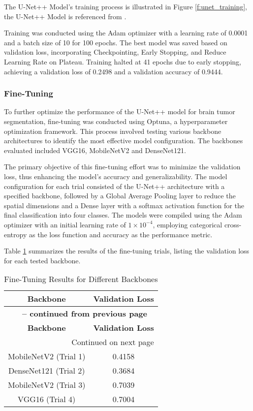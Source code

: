 The U-Net++ Model's training process is illustrated in Figure \ref{f:unet_training}, the U-Net++ Model is referenced from \cite{zhou_unet_2018}.

Training was conducted using the Adam optimizer with a learning rate of 0.0001 and a batch size of 10 for 100 epochs. The best model was saved based on validation loss, incorporating Checkpointing, Early Stopping, and Reduce Learning Rate on Plateau. Training halted at 41 epochs due to early stopping, achieving a validation loss of 0.2498 and a validation accuracy of 0.9444.

\subsubsection{Fine-Tuning}

To further optimize the performance of the U-Net++ model for brain tumor segmentation, fine-tuning was conducted using Optuna, a hyperparameter optimization framework. This process involved testing various backbone architectures to identify the most effective model configuration. The backbones evaluated included VGG16, MobileNetV2 and DenseNet121. 

The primary objective of this fine-tuning effort was to minimize the validation loss, thus enhancing the model's accuracy and generalizability. The model configuration for each trial consisted of the U-Net++ architecture with a specified backbone, followed by a Global Average Pooling layer to reduce the spatial dimensions and a Dense layer with a softmax activation function for the final classification into four classes. The models were compiled using the Adam optimizer with an initial learning rate of $1 \times 10^{-4}$, employing categorical cross-entropy as the loss function and accuracy as the performance metric.

Table \ref{tab:finetuning_results} summarizes the results of the fine-tuning trials, listing the validation loss for each tested backbone.

\begin{longtable}{|c|c|}
\caption{Fine-Tuning Results for Different Backbones}\label{tab:finetuning_results} \\
\hline
\textbf{Backbone} & \textbf{Validation Loss} \\
\hline
\endfirsthead

\multicolumn{2}{c}{{\bfseries \tablename\ \thetable{} -- continued from previous page}} \\
\hline
\textbf{Backbone} & \textbf{Validation Loss} \\
\hline
\endhead

\hline \multicolumn{2}{|r|}{{Continued on next page}} \\ \hline
\endfoot

\hline
\endlastfoot

MobileNetV2 (Trial 1) & 0.4158 \\
\hline
DenseNet121 (Trial 2) & 0.3684 \\
\hline
MobileNetV2 (Trial 3) & 0.7039 \\
\hline
VGG16 (Trial 4) & 0.7004 \\
\end{longtable}


